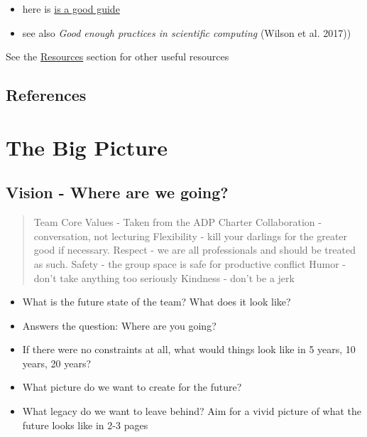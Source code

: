 \documentclass[
  letterpaper,
  DIV=11,
  numbers=noendperiod]{scrreprt}
\providecommand{\tightlist}{%
  \setlength{\itemsep}{0pt}\setlength{\parskip}{0pt}}\usepackage{longtable,booktabs,array}
\begin{document}
\begin{itemize}
  \begin{itemize}
  \tightlist
  \item
    here is
    \href{https://www.r-bloggers.com/2018/08/structuring-r-projects/}{is
    a good guide}\\
  \item
    see also \emph{Good enough practices in scientific computing}
    (Wilson et al. 2017))
  \end{itemize}
\end{itemize}

See the \protect\hyperlink{resources}{Resources} section for other
useful resources

\hypertarget{references}{%
\section{References}\label{references}}


\hypertarget{sec-big-picture}{%
\chapter{The Big Picture}\label{sec-big-picture}}

\hypertarget{vision---where-are-we-going}{%
\section{Vision - Where are we
going?}\label{vision---where-are-we-going}}

\begin{quote}
Team Core Values - Taken from the ADP Charter Collaboration -
conversation, not lecturing Flexibility - kill your darlings for the
greater good if necessary. Respect - we are all professionals and should
be treated as such. Safety - the group space is safe for productive
conflict Humor - don't take anything too seriously Kindness - don't be a
jerk
\end{quote}

\begin{itemize}
\tightlist
\item
  What is the future state of the team? What does it look like?
\item
  Answers the question: Where are you going?
\item
  If there were no constraints at all, what would things look like in 5
  years, 10 years, 20 years?
\item
  What picture do we want to create for the future?
\item
  What legacy do we want to leave behind? Aim for a vivid picture of
  what the future looks like in 2-3 pages
\end{itemize}
\end{document}
